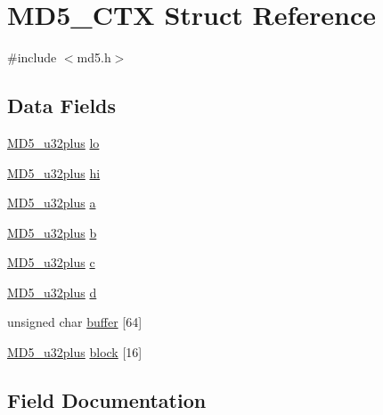 \hypertarget{struct_m_d5___c_t_x}{}\section{M\+D5\+\_\+\+C\+TX Struct Reference}
\label{struct_m_d5___c_t_x}


{\ttfamily \#include $<$md5.\+h$>$}

\subsection*{Data Fields}
\begin{DoxyCompactItemize}
\item 
\mbox{\hyperlink{md5_8h_a7c9e2a59b92cd132f707337f6d940122}{M\+D5\+\_\+u32plus}} \mbox{\hyperlink{struct_m_d5___c_t_x_ab6f070d5d937f16cddb2d666c32fdb8e}{lo}}
\item 
\mbox{\hyperlink{md5_8h_a7c9e2a59b92cd132f707337f6d940122}{M\+D5\+\_\+u32plus}} \mbox{\hyperlink{struct_m_d5___c_t_x_ad674a11709e105451f48b99b9fe54792}{hi}}
\item 
\mbox{\hyperlink{md5_8h_a7c9e2a59b92cd132f707337f6d940122}{M\+D5\+\_\+u32plus}} \mbox{\hyperlink{struct_m_d5___c_t_x_ac5629798efe5fb7cbd33911a77672275}{a}}
\item 
\mbox{\hyperlink{md5_8h_a7c9e2a59b92cd132f707337f6d940122}{M\+D5\+\_\+u32plus}} \mbox{\hyperlink{struct_m_d5___c_t_x_ae7735a3daa065dc9dfab9dd1a512d557}{b}}
\item 
\mbox{\hyperlink{md5_8h_a7c9e2a59b92cd132f707337f6d940122}{M\+D5\+\_\+u32plus}} \mbox{\hyperlink{struct_m_d5___c_t_x_a1f90d3ede1c4253a90685d1260482dfc}{c}}
\item 
\mbox{\hyperlink{md5_8h_a7c9e2a59b92cd132f707337f6d940122}{M\+D5\+\_\+u32plus}} \mbox{\hyperlink{struct_m_d5___c_t_x_a42be18d895cf7be9097073faf66734c1}{d}}
\item 
unsigned char \mbox{\hyperlink{struct_m_d5___c_t_x_a59e96eea04541ecd67c3faca41b13feb}{buffer}} \mbox{[}64\mbox{]}
\item 
\mbox{\hyperlink{md5_8h_a7c9e2a59b92cd132f707337f6d940122}{M\+D5\+\_\+u32plus}} \mbox{\hyperlink{struct_m_d5___c_t_x_ad8cb52dd70ac5316564b1e4b48b0ad7d}{block}} \mbox{[}16\mbox{]}
\end{DoxyCompactItemize}


\subsection{Field Documentation}
\mbox{\label{struct_m_d5___c_t_x_ac5629798efe5fb7cbd33911a77672275}} 
